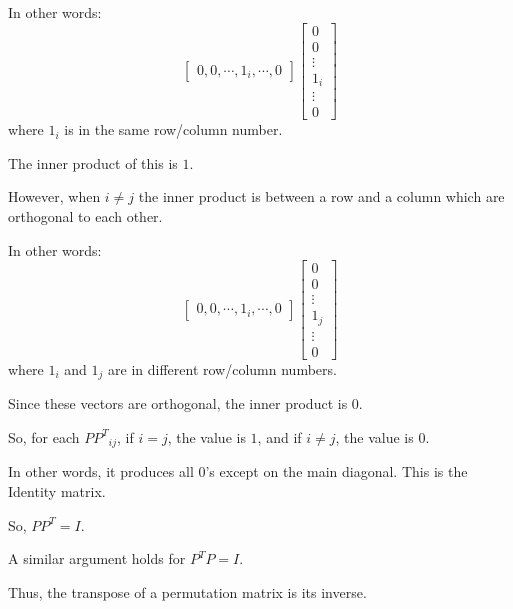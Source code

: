 \documentclass[12pt,letterpaper]{article}
\begin{document}
\begin{enumerate}
      In other words:
        \[
          \begin{bmatrix}
            0, 0, \cdots, 1_i, \cdots, 0
          \end{bmatrix}
          \begin{bmatrix}
            0 \\
            0 \\
            \vdots \\
            1_i \\
            \vdots \\
            0
          \end{bmatrix}
        \]
      where $1_i$ is in the same row/column number.

      The inner product of this is $1$.

      However, when $i \ne j$ the inner product is between a row and a column which are orthogonal to each other.

      In other words:
        \[
          \begin{bmatrix}
            0, 0, \cdots, 1_i, \cdots, 0
          \end{bmatrix}
          \begin{bmatrix}
            0 \\
            0 \\
            \vdots \\
            1_j \\
            \vdots \\
            0
          \end{bmatrix}
        \]
      where $1_i$ and $1_j$ are in different row/column numbers.

      Since these vectors are orthogonal, the inner product is $0$.

      So, for each ${PP^T}_{i j}$, if $i = j$, the value is $1$,
      and if $i \ne j$, the value is $0$.

      In other words, it produces all $0$'s except on the main diagonal.
      This is the Identity matrix.

      So, $PP^T = I$.

      A similar argument holds for $P^TP = I$.

      Thus, the transpose of a permutation matrix is its inverse.
  \end{enumerate}
\end{document}
